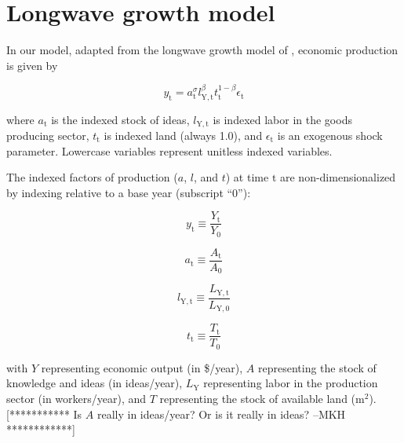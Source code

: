 \documentclass[letterpaper,12pt]{article}
\begin{document}

\section{Longwave growth model}
In our model, adapted from the longwave growth model of \citet{Jones2001}, economic production is given by

\begin{equation} \label{eq:Jones_production_function}
	y_\mathrm{t} = a_\mathrm{t} ^\sigma l_\mathrm{Y,t} ^\beta t_\mathrm{t} ^{1-\beta} \epsilon_\mathrm{t}
\end{equation}

\noindent where $a_\mathrm{t}$ is the indexed stock of ideas, $l_\mathrm{Y,t}$ is indexed labor in the goods producing sector, $t_\mathrm{t}$ is indexed land (always 1.0), and $\epsilon_\mathrm{t}$ is an exogenous shock parameter. Lowercase variables represent unitless indexed variables.

The indexed factors of production ($a$, $l$, and $t$) at time $\mathrm{t}$ are non-dimensionalized by indexing relative to a base year (subscript ``0''):

\begin{equation} \label{eq:index_y}
	y_\mathrm{t} \equiv \frac{Y_\mathrm{t}}{Y_\mathrm{0}}
\end{equation}

\begin{equation} \label{eq:index_a}
	a_\mathrm{t} \equiv \frac{A_\mathrm{t}}{A_\mathrm{0}}
\end{equation}

\begin{equation} \label{eq:index_l}
	l_\mathrm{Y,t} \equiv \frac{L_\mathrm{Y,t}}{L_\mathrm{Y,0}}
\end{equation}

\begin{equation} \label{eq:index_t}
	t_\mathrm{t} \equiv \frac{T_\mathrm{t}}{T_\mathrm{0}}
\end{equation}

\noindent with $Y$ representing economic output (in \$/year), $A$ representing the stock of knowledge and ideas (in ideas/year), $L_\mathrm{Y}$ representing labor in the production sector (in workers/year), and $T$ representing the stock of available land ($\mathrm{m}^2$). [*********** Is $A$ really in ideas/year? Or is it really in ideas? --MKH ************]
\end{document}
